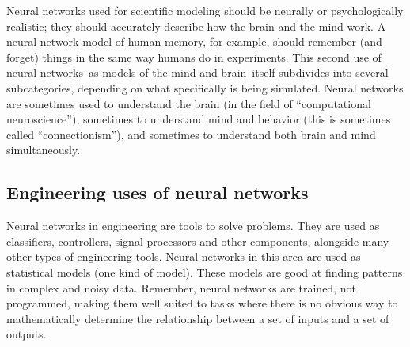 Neural networks used for scientific modeling should be neurally or psychologically realistic; they should accurately describe how the brain and the mind work. A neural network model of human memory, for example, should remember (and forget) things in the same way humans do in experiments. This second use of neural networks--as models of the mind and brain--itself subdivides into several subcategories, depending on what specifically is being simulated. Neural networks are sometimes used to understand the brain (in the field of ``computational neuroscience''), sometimes to understand mind and behavior (this is sometimes called ``connectionism''), and sometimes to understand both brain and mind simultaneously.
 
\subsection{Engineering uses of neural networks}\label{machineLearning}


Neural networks in engineering are tools to solve problems. They are used as classifiers, controllers, signal processors and other components, alongside many other types of engineering tools. Neural networks in this area are used as statistical models (one kind of   model). These models are good at  finding patterns in complex and noisy data. Remember, neural networks are trained, not programmed, making them well suited to tasks where there is no obvious way to mathematically determine the relationship between a set of inputs and a set of outputs.


